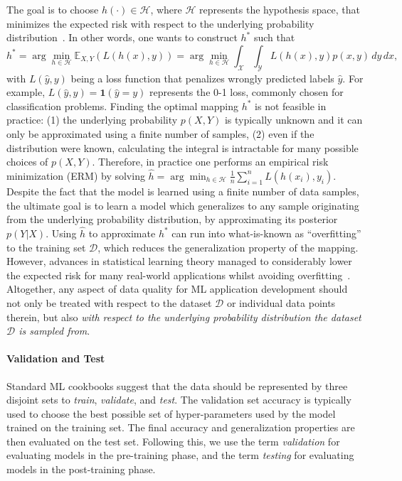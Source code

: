\documentclass[11pt]{article}
\def \cD {\mathcal D}
\def \cH {\mathcal H}
\def \cX {\mathcal X}
\def \cY {\mathcal Y}
\begin{document}
The goal is to choose $h(\cdot) \in \cH$, 
where $\cH$ represents the hypothesis space, that minimizes the expected risk with respect to the underlying probability distribution~\cite{shalev2014understanding}. In other words, one wants to construct $h^*$ such that
\begin{equation}
\label{eq:expected_risk}
h^* = \arg \min_{h \in \cH} \mathbb{E}_{X,Y} \left( L(h(x), y) \right) = \arg \min_{h \in \cH} \int_\cX \int_\cY L(h(x), y) p(x, y)\,dy\,dx ,
\end{equation}
with $L(\hat{y}, y)$ being a loss function that penalizes wrongly predicted labels  $\hat{y}$. For example, $L(\hat{y}, y) = \mathbf{1} (\hat{y} = y)$ represents the 0-1 loss, commonly chosen for classification problems. 
Finding the optimal mapping $h^*$ is not feasible in practice: (1) the underlying probability $p(X,Y)$ is typically unknown and it can only be approximated using a finite number of samples, (2) even if the distribution were known, calculating the integral is intractable for many possible choices of $p(X,Y)$. Therefore, in practice one performs an empirical risk minimization (ERM) by solving 
$\hat{h} = \arg \min_{h \in \cH} \frac{1}{n} \sum_{i=1}^n L(h(x_i), y_i).$
Despite the fact that the model is learned using a finite number of data samples, the ultimate goal is to learn a model which generalizes to any sample originating from the underlying probability distribution, by approximating its posterior $p(Y|X)$.
Using $\hat{h}$ to approximate $h^*$ can run into what-is-known as ``overfitting'' to the training set $\cD$, which reduces the generalization property of the mapping.
However, advances in statistical learning theory managed to considerably lower the expected risk for many real-world applications whilst avoiding overfitting~\cite{friedman2001elements, vapnik2015uniform, shalev2014understanding}.  Altogether, any aspect of data quality for ML application development should not only be treated with respect to the dataset $\cD$ or individual data points therein, but also \emph{with respect to the underlying probability distribution the dataset $\cD$ is sampled from}.

\paragraph{Validation and Test}

Standard ML cookbooks suggest that the data should be represented by three disjoint sets to \emph{train}, \emph{validate}, and \emph{test}. 
The validation set accuracy is typically used to choose the best possible set of hyper-parameters used by the model trained on the training set.
The final accuracy and generalization properties are then evaluated on the test set. Following this, we use the term \textit{validation} for evaluating models in the pre-training phase, and the term \textit{testing} for evaluating models in the post-training phase.
\end{document}
